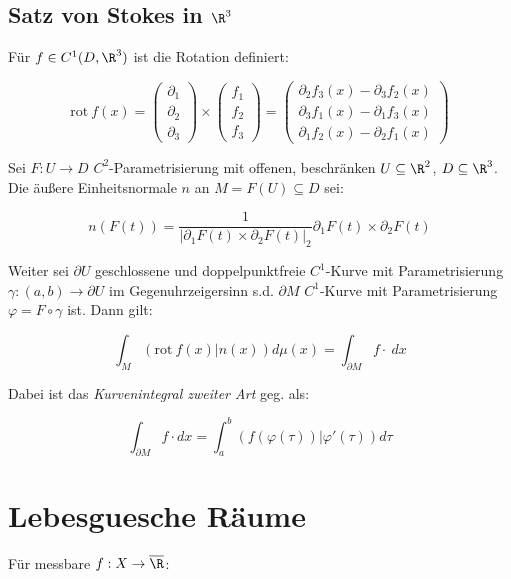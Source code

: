 \subsection*{Satz von Stokes in $\R^3$}

Für $f \in C^1(D,\R^3)$ ist die Rotation definiert:

\vspace{-4mm}
\[ \text{rot} \ f(x) = \begin{pmatrix}
	\partial_1 \\
	\partial_2 \\
	\partial_3
\end{pmatrix} \times \begin{pmatrix}
	f_1 \\
	f_2 \\
	f_3
\end{pmatrix} = \begin{pmatrix}
	\partial_2 f_3(x) - \partial_3 f_2(x) \\
	\partial_3 f_1(x) - \partial_1 f_3(x) \\
	\partial_1 f_2(x) - \partial_2 f_1(x)
\end{pmatrix} \]

Sei $F : U \to D$ $C^2$-Parametrisierung mit offenen, beschränken $U \subseteq \R^2$, $D \subseteq \R^3$. Die äußere Einheitsnormale $n$ an $M = F(U) \subseteq D$ sei:

\vspace{-4mm}
\[ n(F(t)) = \frac{1}{|\partial_1 F(t) \times \partial_2 F(t)|_2} \partial_1 F(t) \times \partial_2 F(t) \]

Weiter sei $\partial U$ geschlossene und doppelpunktfreie $C^1$-Kurve mit Parametrisierung $\gamma : (a,b) \to \partial U$ im Gegenuhrzeigersinn s.d. $\partial M$ $C^1$-Kurve mit Parametrisierung $\varphi = F \circ \gamma$ ist.
Dann gilt:

\vspace{-2mm}
\[ \int_M (\text{rot} \ f(x) | n(x)) d\mu(x) = \int_{\partial M} f \cdot \ dx \]

Dabei ist das \emph{Kurvenintegral zweiter Art} geg. als:

\vspace{-2mm}
\[ \int_{\partial M} f \cdot dx = \int_a^b (f(\varphi(\tau))|\varphi'(\tau)) d\tau \]

\section*{Lebesguesche Räume}

Für messbare $f : X \to \overline\R$:

